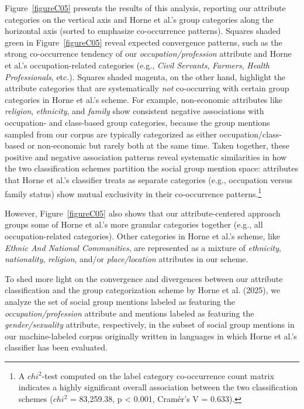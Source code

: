 \documentclass[12pt]{article}
\begin{document}
Figure~\ref{figureC05} presents the results of this analysis, reporting our attribute categories on the vertical axis and Horne et al.'s group categories along the horizontal axis (sorted to emphasize co-occurrence patterns).
Squares shaded green in Figure~\ref{figureC05} reveal expected convergence patterns, such as the strong co-occurrence tendency of our \emph{occupation/profession} attribute and Horne et al.'s occupation-related categories (e.g., \emph{Civil Servants}, \emph{Farmers}, \emph{Health Professionals}, etc.).
Squares shaded magenta, on the other hand, highlight the attribute categories that are systematically \emph{not} co-occurring with certain group categories in Horne et al.'s scheme.
For example, non-economic attributes like \emph{religion}, \emph{ethnicity}, and \emph{family} show consistent negative associations with occupation- and class-based group categories, because the group mentions sampled from our corpus are typically categorized as either occupation/class-based or non-economic but rarely both at the same time.
Taken together, these positive and negative association patterns reveal systematic similarities in how the two classification schemes partition the social group mention space: attributes that Horne et al.'s classifier treats as separate categories (e.g., occupation versus family status) show mutual exclusivity in their co-occurrence patterns.\footnote{A \(chi^2\)-test computed on the label category co-occurrence count matrix indicates a highly significant overall association between the two classification schemes (\(chi^2\) = 83,259.38, p \textless{} 0.001, Cramér's V = 0.633).}

However, Figure~\ref{figureC05} also shows that our attribute-centered approach groups some of Horne et al.'s more granular categories together (e.g., all occupation-related categories).
Other categories in Horne et al.'s scheme, like \emph{Ethnic And National Communities}, are represented as a mixture of \emph{ethnicity}, \emph{nationality}, \emph{religion}, and/or \emph{place/location} attributes in our scheme.
 
To shed more light on the convergence and divergences between our attribute classification and the group categorization scheme by Horne et al. (2025), we analyze the set of social group mentions labeled as featuring the \emph{occupation/profession} attribute and mentions labeled as featuring the \emph{gender/sexuality} attribute, respectively, in the subset of social group mentions in our machine-labeled corpus originally written in languages in which Horne et al.'s classifier has been evaluated.
\end{document}
